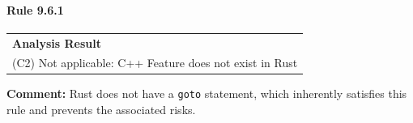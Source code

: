 \paragraph{Rule 9.6.1}
\begin{longtable}{p{13cm}}
\textbf{Analysis Result} \\
(C2) Not applicable: C++ Feature does not exist in Rust \\
\end{longtable}
\textbf{Comment:} Rust does not have a \texttt{goto} statement, which inherently satisfies this rule and prevents the associated risks. \\
